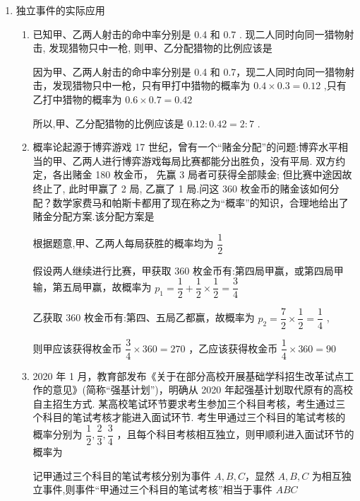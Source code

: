 \begin{enumerate}
\begin{enumerate}
\begin{jieda}
            若第一次乙先投篮，则前 4 次中甲恰好投篮 3 次的概率为: $\dfrac{2}{3} \times  \dfrac{2}{3} \times  \dfrac{2}{3} \times  1 = \dfrac{8}{27}$
            
            故前 4 次中甲恰好投篮 3 次的概率为 $\dfrac{12}{27} + \dfrac{8}{27} = \dfrac{20}{27}$
        \end{jieda}
    \end{enumerate}
    \item 独立事件的实际应用
    \begin{enumerate}
        \item 已知甲、乙两人射击的命中率分别是 0.4 和 0.7 . 现二人同时向同一猎物射击, 发现猎物只中一枪, 则甲、乙分配猎物的比例应该是
        \begin{jieda}
            因为甲、乙两人射击的命中率分别是 0.4 和 0.7，现二人同时向同一猎物射击，发现猎物只中一枪，只有甲打中猎物的概率为 ${0.4} \times  {0.3} = {0.12}$ ,只有乙打中猎物的概率为 ${0.6} \times  {0.7} = {0.42}$
            
            所以,甲、乙分配猎物的比例应该是 ${0.12} : {0.42} = 2 : 7$ .
        \end{jieda}
        
        \item 概率论起源于博弈游戏 17 世纪，曾有一个“赌金分配”的问题:博弈水平相当的甲、乙两人进行博弈游戏每局比赛都能分出胜负，没有平局. 双方约定，各出赌金 180 枚金币， 先赢 3 局者可获得全部赎金; 但比赛中途因故终止了, 此时甲赢了 2 局, 乙赢了 1 局.问这 360 枚金币的赌金该如何分配？数学家费马和帕斯卡都用了现在称之为“概率”的知识，合理地给出了赌金分配方案.该分配方案是
        \begin{jieda}
            根据题意,甲、乙两人每局获胜的概率均为 $\dfrac{1}{2}$
            
            假设两人继续进行比赛，甲获取 360 枚金币有:第四局甲赢，或第四局甲输，第五局甲赢，故概率为 ${p}_{1} = \dfrac{1}{2} + \dfrac{1}{2} \times  \dfrac{1}{2} = \dfrac{3}{4}$
            
            乙获取 360 枚金币有:第四、五局乙都赢，故概率为 ${p}_{2} = \dfrac{7}{2} \times  \dfrac{1}{2} = \dfrac{1}{4}$ ,
            
            则甲应该获得枚金币 $\dfrac{3}{4} \times  {360} = {270}$ ，乙应该获得枚金币 $\dfrac{1}{4} \times  {360} = {90}$
        \end{jieda}
        
        \item 2020 年 1 月，教育部发布《关于在部分高校开展基础学科招生改革试点工作的意见》(简称“强基计划”)，明确从 2020 年起强基计划取代原有的高校自主招生方式. 某高校笔试环节要求考生参加三个科目考核，考生通过三个科目的笔试考核才能进入面试环节. 考生甲通过三个科目的笔试考核的概率分别为 $\dfrac{1}{2},\dfrac{2}{3},\dfrac{3}{4}$ ，且每个科目考核相互独立，则甲顺利进入面试环节的概率为
        \begin{jieda}
            记甲通过三个科目的笔试考核分别为事件 $A,B,C$，显然 $A,B,C$ 为相互独立事件,则事件“甲通过三个科目的笔试考核”相当于事件 ${ABC}$ 
            

\end{jieda}
\end{enumerate}
\end{enumerate}
